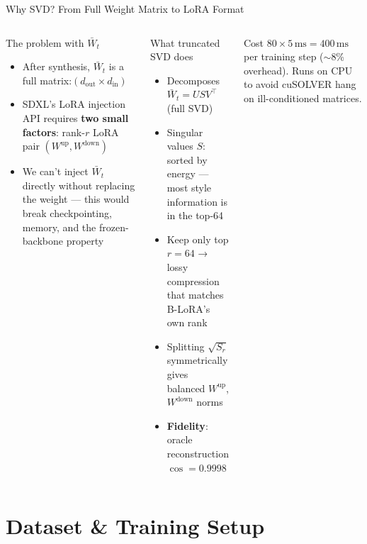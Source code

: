 \documentclass[aspectratio=169,10pt]{beamer}
\begin{document}
\begin{frame}[shrink=10]{Why SVD? From Full Weight Matrix to LoRA Format}
\begin{columns}[T]
      \begin{block}{The problem with $\bar{W}_t$}
        \begin{itemize}
          \item After synthesis, $\bar{W}_t$ is a full matrix:\quad $(d_\text{out}\!\times\!d_\text{in})$
          \item SDXL's LoRA injection API requires \textbf{two small factors}: rank-$r$ LoRA pair $(W^\text{up}, W^\text{down})$
          \item We can't inject $\bar{W}_t$ directly without replacing the weight — this would break checkpointing, memory, and the frozen-backbone property
        \end{itemize}
      \end{block}
      \begin{exampleblock}{What truncated SVD does}
        \begin{itemize}
          \item Decomposes $\bar{W}_t = U S V^\top$ (full SVD)
          \item Singular values $S$: sorted by energy — most style information is in the top-64
          \item Keep only top $r=64$ → lossy compression that matches B-LoRA's own rank
          \item Splitting $\sqrt{S_r}$ symmetrically gives balanced $W^\text{up}$, $W^\text{down}$ norms
          \item \textbf{Fidelity}: oracle reconstruction $\cos = 0.9998$
        \end{itemize}
      \end{exampleblock}
      \begin{alertblock}{\small Cost}
        \footnotesize $80 \times 5\,\text{ms} = 400\,\text{ms}$ per training step ($\sim$8\% overhead). Runs on CPU to avoid cuSOLVER hang on ill-conditioned matrices.
      \end{alertblock}
  \end{columns}
\end{frame}

\section{Dataset \& Training Setup}
\end{document}
